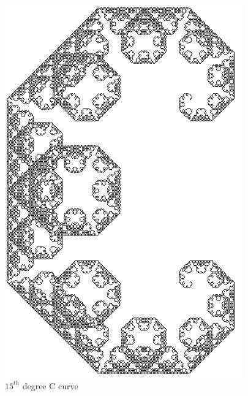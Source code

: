 \documentclass{article}
\begin{document}
\begin{figure}[H]
    \centering
    \includegraphics[scale=0.4]{figures/c15}
    \caption{\(15^{th}\) degree C curve}
\end{figure}
\end{document}
